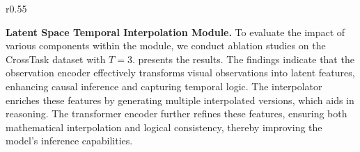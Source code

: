 \begin{wraptable}{r}{0.55\textwidth}
\vspace{-10pt}
\centering
\caption{Component ablation. Note: Int: Interpolation, Enc: Encoder, Trans: Transformer.}
\label{tab:component_ablation}
\vspace{-10pt}
\end{wraptable}
\textbf{Latent Space Temporal Interpolation Module.} To evaluate the impact of various components within the module, we conduct ablation studies on the CrossTask dataset with $T=3$.  presents the results. The findings indicate that the observation encoder effectively transforms visual observations into latent features, enhancing causal inference and capturing temporal logic. The interpolator enriches these features by generating multiple interpolated versions, which aids in reasoning. The transformer encoder further refines these features, ensuring both mathematical interpolation and logical consistency, thereby improving the model's inference capabilities.


